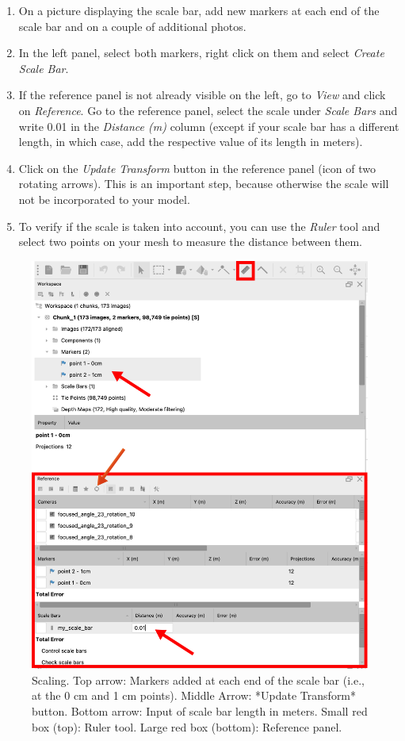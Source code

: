 \documentclass[
]{book}
\begin{document}
\begin{enumerate}
\def\labelenumi{\arabic{enumi}.}
\item
  On a picture displaying the scale bar, add new markers at each end
  of the scale bar and on a couple of additional photos.
\item
  In the left panel, select both markers, right click on them and select
  \emph{Create Scale Bar}.
\item
  If the reference panel is not already visible on the left, go to \emph{View} and click on
  \emph{Reference}. Go to the reference panel, select the scale under \emph{Scale Bars} and write
  0.01 in the \emph{Distance (m)} column (except if your scale bar has a different length,
  in which case, add the respective value of its length in meters).
\item
  Click on the \emph{Update Transform} button in the reference panel (icon of two
  rotating arrows). This is an important step, because otherwise the scale will
  not be incorporated to your model.
\item
  To verify if the scale is taken into account, you can use the
  \emph{Ruler} tool and select two points on your mesh to measure the distance between them.
\end{enumerate}

\begin{figure}

{\centering \includegraphics[width=0.75\linewidth]{Figures/Add_scale} 

}

\caption{Scaling. Top arrow: Markers added at each end of the scale bar (i.e., at the 0 cm and 1 cm points). Middle Arrow: *Update Transform* button. Bottom arrow: Input of scale bar length in meters. Small red box (top): Ruler tool. Large red box (bottom): Reference panel.}\label{fig:adds-cale}
\end{figure}
\end{document}
